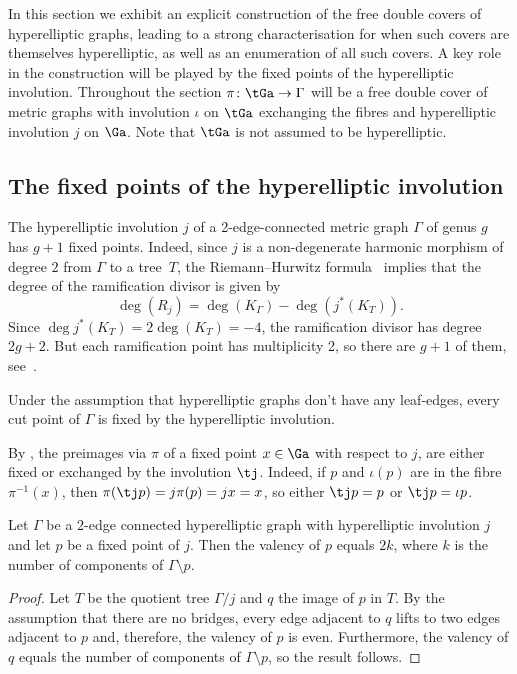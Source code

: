 {  
In this section we exhibit an explicit construction of the free double covers of hyperelliptic graphs, leading to a strong characterisation for when such covers are themselves hyperelliptic, as well as an enumeration of all such covers. 
A key role in the construction will be played by the fixed points of the hyperelliptic involution. 
Throughout the section  $\pi\colon \tGa\to \Gamma$ will be a free double cover of metric graphs with involution $\iota$ on $\tGa$ exchanging the fibres and hyperelliptic involution $j$ on $\Ga$. Note that $\tGa$ is not assumed to be hyperelliptic. 


\subsection{The fixed points of the hyperelliptic involution}\label{sec:fixedpoints}
    The hyperelliptic involution  $j$ of a 2-edge-connected metric graph $\Gamma$ of genus $g$ has $g+1$ fixed points. Indeed, since $j$ is a non-degenerate harmonic morphism of degree $2$ from $\Gamma$ to a tree~$T$, the Riemann--Hurwitz formula~\cite[Section 2.10]{ABBR} implies that
 the degree of the ramification divisor is given by
\begin{equation}\label{numberOfFixedPoints}
        \deg(R_j)=\deg(K_{\Gamma})-\deg(j^*(K_T)).
    \end{equation}
    Since $\deg j^*(K_T)=2\deg(K_T)=-4$, the ramification divisor has degree $2g+2$. But each ramification point has multiplicity 2, so there are $g+1$ of them, see~\cite[Proposition 9]{Panizzut}.
    
\begin{rema}
 Under the assumption that hyperelliptic graphs don't have any leaf-edges, every cut point of $\Gamma$ is fixed by the hyperelliptic involution. 

\end{rema}


\begin{rema}\label{rem:onlytwochoicesfortheinvolution}
By , the preimages via $\pi$ of a fixed point $x\in \Ga$ with respect to $j$, are either fixed  or exchanged by the involution $\tj$. Indeed, if $p$ and $\iota(p)$ are in the fibre $\pi^{-1}(x)$, then 
 $\pi(\tj p) = j \pi (p) = j x = x$, so either $\tj p = p$  or $\tj p=\iota p$. 
\end{rema}


\begin{prop}\label{prop:valencyoffixedpoints}
    Let $\Gamma$ be a $2$-edge connected hyperelliptic graph  with hyperelliptic involution $j$ and let $p$ be a fixed point of $j$. Then the valency of $p$ equals $2k$, where $k$ is the number of components of $\Gamma\setminus{p}$.
\end{prop}
\begin{proof}
Let $T$ be the quotient tree $\Gamma/j$ and $q$ the image of $p$ in $T$. By the assumption that there are no bridges, every edge adjacent to $q$ lifts to two edges adjacent to $p$ and, therefore, the valency of $p$ is even. Furthermore, the valency of $q$ equals the number of components of $\Gamma\setminus{p}$, so the result follows. 
\end{proof}

}
